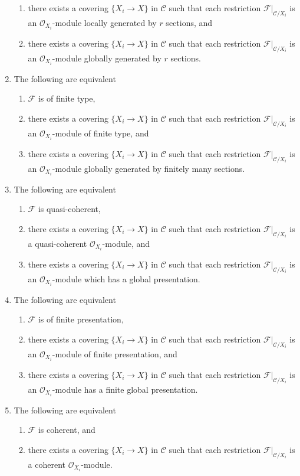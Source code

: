\begin{lemma}
\begin{enumerate}
\begin{enumerate}
\item there exists a covering $\{X_i \to X\}$ in $\mathcal{C}$
such that each restriction $\mathcal{F}|_{\mathcal{C}/X_i}$
is an $\mathcal{O}_{X_i}$-module locally generated by $r$ sections, and
\item there exists a covering $\{X_i \to X\}$ in $\mathcal{C}$
such that each restriction $\mathcal{F}|_{\mathcal{C}/X_i}$
is an $\mathcal{O}_{X_i}$-module globally generated by $r$ sections.
\end{enumerate}
\item The following are equivalent
\begin{enumerate}
\item $\mathcal{F}$ is of finite type,
\item there exists a covering $\{X_i \to X\}$ in $\mathcal{C}$
such that each restriction $\mathcal{F}|_{\mathcal{C}/X_i}$
is an $\mathcal{O}_{X_i}$-module of finite type, and
\item there exists a covering $\{X_i \to X\}$ in $\mathcal{C}$
such that each restriction $\mathcal{F}|_{\mathcal{C}/X_i}$
is an $\mathcal{O}_{X_i}$-module globally generated by finitely many sections.
\end{enumerate}
\item The following are equivalent
\begin{enumerate}
\item $\mathcal{F}$ is quasi-coherent,
\item there exists a covering $\{X_i \to X\}$ in $\mathcal{C}$
such that each restriction $\mathcal{F}|_{\mathcal{C}/X_i}$
is a quasi-coherent $\mathcal{O}_{X_i}$-module, and
\item there exists a covering $\{X_i \to X\}$ in $\mathcal{C}$
such that each restriction $\mathcal{F}|_{\mathcal{C}/X_i}$
is an $\mathcal{O}_{X_i}$-module which has a global presentation.
\end{enumerate}
\item The following are equivalent
\begin{enumerate}
\item $\mathcal{F}$ is of finite presentation,
\item there exists a covering $\{X_i \to X\}$ in $\mathcal{C}$
such that each restriction $\mathcal{F}|_{\mathcal{C}/X_i}$
is an $\mathcal{O}_{X_i}$-module of finite presentation, and
\item there exists a covering $\{X_i \to X\}$ in $\mathcal{C}$
such that each restriction $\mathcal{F}|_{\mathcal{C}/X_i}$
is an $\mathcal{O}_{X_i}$-module has a finite global presentation.
\end{enumerate}
\item The following are equivalent
\begin{enumerate}
\item $\mathcal{F}$ is coherent, and
\item there exists a covering $\{X_i \to X\}$ in $\mathcal{C}$
such that each restriction $\mathcal{F}|_{\mathcal{C}/X_i}$
is a coherent $\mathcal{O}_{X_i}$-module.
\end{enumerate}
\end{enumerate}
\end{lemma}

